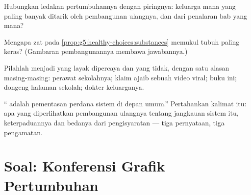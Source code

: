 \begin{exercise}[$\star\star$]\label{exo:g8:puberty:9}
Hubungkan ledakan pertumbuhannya dengan piringnya: keluarga
 mana yang paling banyak ditarik oleh pembangunan
ulangnya, dan dari penalaran bab yang mana?
\end{exercise}

\begin{exercise}[$\star\star$]\label{exo:g8:puberty:10}
Mengapa zat pada \cref{prop:g5:healthy-choices:substances}
memukul tubuh  paling keras? (Gambaran pembangunannya
membawa jawabannya.)
\end{exercise}

\begin{exercise}[$\star\star$]\label{exo:g8:puberty:11}
Pilahlah menjadi yang layak dipercaya dan yang tidak, dengan
satu alasan masing-masing: perawat sekolahnya; klaim ajaib
sebuah video viral; buku ini; dongeng halaman sekolah; dokter keluarganya.
\end{exercise}

\begin{exercise}[$\star\star\star$]\label{exo:g8:puberty:12}
`` adalah pementasan perdana sistem  di depan
umum.'' Pertahankan kalimat itu: apa yang diperlihatkan
pembangunan ulangnya tentang jangkauan sistem itu,
keterpaduannya dan bedanya dari pengisyaratan  --- tiga
pernyataan, tiga pengamatan.
\end{exercise}

\section{Soal: Konferensi Grafik Pertumbuhan}

